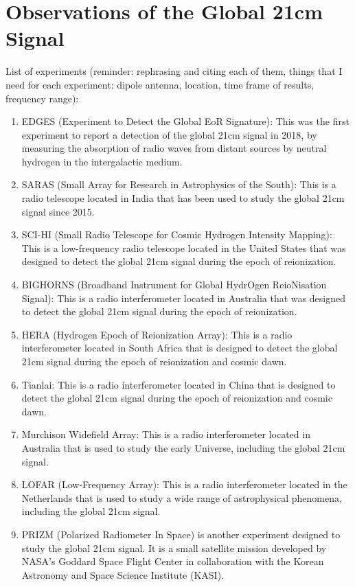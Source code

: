 \documentclass[12pt, TexShade, letterpaper]{report}
\begin{document}
\chapter{Observations of the Global 21cm Signal}
\label{chap:observations}
List of experiments (reminder: rephrasing and citing each of them,  things that I need for each experiment: dipole antenna, location, time frame of results, frequency range):\par
\begin{enumerate}
\item EDGES (Experiment to Detect the Global EoR Signature): This was the first experiment to report a detection of the global 21cm signal in 2018, by measuring the absorption of radio waves from distant sources by neutral hydrogen in the intergalactic medium.

\item SARAS (Small Array for Research in Astrophysics of the South): This is a radio telescope located in India that has been used to study the global 21cm signal since 2015.

\item SCI-HI (Small Radio Telescope for Cosmic Hydrogen Intensity Mapping): This is a low-frequency radio telescope located in the United States that was designed to detect the global 21cm signal during the epoch of reionization.

\item BIGHORNS (Broadband Instrument for Global HydrOgen ReioNisation Signal): This is a radio interferometer located in Australia that was designed to detect the global 21cm signal during the epoch of reionization.

\item HERA (Hydrogen Epoch of Reionization Array): This is a radio interferometer located in South Africa that is designed to detect the global 21cm signal during the epoch of reionization and cosmic dawn.

\item Tianlai: This is a radio interferometer located in China that is designed to detect the global 21cm signal during the epoch of reionization and cosmic dawn.

\item Murchison Widefield Array: This is a radio interferometer located in Australia that is used to study the early Universe, including the global 21cm signal.

\item LOFAR (Low-Frequency Array): This is a radio interferometer located in the Netherlands that is used to study a wide range of astrophysical phenomena, including the global 21cm signal.
\item PRIZM (Polarized Radiometer In Space) is another experiment designed to study the global 21cm signal. It is a small satellite mission developed by NASA's Goddard Space Flight Center in collaboration with the Korean Astronomy and Space Science Institute (KASI).


\end{enumerate}
\end{document}
